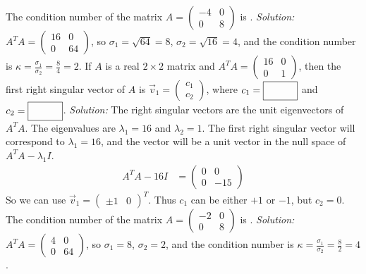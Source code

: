 \fi 
\ifnum {}
    The condition number of the matrix $A=\begin{pmatrix}-4&0\\0&8\end{pmatrix}$ is 
        \framebox{\strut\hspace{1cm}}.
    \ifnum {} {\color{DarkBlue} \textit{Solution:} $A^TA = \begin{pmatrix} 16&0\\0&64\end{pmatrix}$, so $\sigma_1 = \sqrt{64} = 8$, $\sigma_2 = \sqrt{16} = 4$, and the condition number is $\kappa  = \frac{\sigma_1}{\sigma_2} = \frac 84 = 2$.   } \fi      
\fi 
\ifnum {}
    If $A$ is a real $2\times2$ matrix and $A^TA = \begin{pmatrix} 16&0\\0&1 \end{pmatrix}$, then the first right singular vector of $A$ is $\vec v_1 = \begin{pmatrix} c_1\\c_2\end{pmatrix}$, where $c_1 = \framebox{\strut\hspace{1cm}}$ and $c_2 = \framebox{\strut\hspace{1cm}}$. 
    \ifnum {} {\color{DarkBlue} \textit{Solution:} The right singular vectors are the unit eigenvectors of $A^TA$. The eigenvalues are $\lambda_1=16$ and $\lambda_2=1$. The first right singular vector will correspond to $\lambda_1 = 16$, and the vector will be a unit vector in the null space of $A^TA - \lambda_1I$. 
    \begin{align}
        A^TA - 16 I &= \begin{pmatrix} 0&0\\0&-15\end{pmatrix} 
    \end{align} So we can use $\vec v_1 = \begin{pmatrix} \pm 1 & 0\end{pmatrix}^T$. Thus $c_1$ can be either $+1$ or $-1$, but $c_2=0$.   } \fi    
\fi 
\ifnum {}
    The condition number of the matrix $A=\begin{pmatrix}-2&0\\0&8 \end{pmatrix}$ is 
        \framebox{\strut\hspace{1cm}}.
    \ifnum {} {\color{DarkBlue} \textit{Solution:} $A^TA = \begin{pmatrix} 4&0\\0&64\end{pmatrix}$, so $\sigma_1 = 8$, $\sigma_2 = 2$, and the condition number is $\kappa  = \frac{\sigma_1}{\sigma_2} = \frac 82 = 4$.   } \fi    
